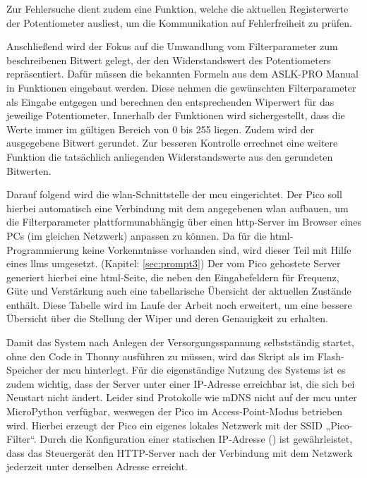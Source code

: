 \documentclass[../main_config.tex]{subfiles}
\begin{document}
Zur Fehlersuche dient zudem eine Funktion, welche die aktuellen Registerwerte der Potentiometer ausliest, um die Kommunikation auf Fehlerfreiheit zu prüfen.\par
\medskip 

Anschließend wird der Fokus auf die Umwandlung vom Filterparameter zum beschreibenen Bitwert gelegt, der den Widerstandswert des Potentiometers repräsentiert. Dafür müssen die bekannten Formeln aus dem ASLK-PRO Manual \cite{Lab_Kit_PRO} in Funktionen eingebaut werden. Diese nehmen die gewünschten Filterparameter als Eingabe entgegen und berechnen den entsprechenden Wiperwert für das jeweilige Potentiometer. Innerhalb der Funktionen wird sichergestellt, dass die Werte immer im gültigen Bereich von 0 bis 255 liegen. Zudem wird der ausgegebene Bitwert gerundet. Zur besseren Kontrolle errechnet eine weitere Funktion die tatsächlich anliegenden Widerstandswerte aus den gerundeten Bitwerten. \par
\medskip

Darauf folgend wird die \gls{wlan}-Schnittstelle der \gls{mcu} eingerichtet. Der Pico soll hierbei automatisch eine Verbindung mit dem angegebenen \gls{wlan} aufbauen, um die Filterparameter plattformunabhängig über einen \gls{http}-Server im Browser eines PCs (im gleichen Netzwerk) anpassen zu können. Da für die \gls{html}-Programmierung keine Vorkenntnisse vorhanden sind, wird dieser Teil mit Hilfe eines \glspl{llm} umgesetzt. (Kapitel: \ref{sec:prompt3}) Der vom Pico gehostete Server generiert hierbei eine \gls{html}-Seite, die neben den Eingabefeldern für Frequenz, Güte und Verstärkung auch eine tabellarische Übersicht der aktuellen Zustände enthält. Diese Tabelle wird im Laufe der Arbeit noch erweitert, um eine bessere Übersicht über die Stellung der Wiper und deren Genauigkeit zu erhalten. \par
\medskip

Damit das System nach Anlegen der Versorgungsspannung selbstständig startet, ohne den Code in Thonny ausführen zu müssen, wird das Skript als  im Flash-Speicher der \gls{mcu} hinterlegt. Für die eigenständige Nutzung des Systems ist es zudem wichtig, dass der Server unter einer IP-Adresse erreichbar ist, die sich bei Neustart nicht ändert. Leider sind Protokolle wie mDNS nicht auf der \gls{mcu} unter MicroPython verfügbar, weswegen der Pico im Access-Point-Modus betrieben wird. Hierbei erzeugt der Pico ein eigenes lokales Netzwerk mit der SSID „Pico-Filter“. Durch die Konfiguration einer statischen IP-Adresse () ist gewährleistet, dass das Steuergerät den HTTP-Server nach der Verbindung mit dem Netzwerk jederzeit unter derselben Adresse erreicht.
\end{document}
